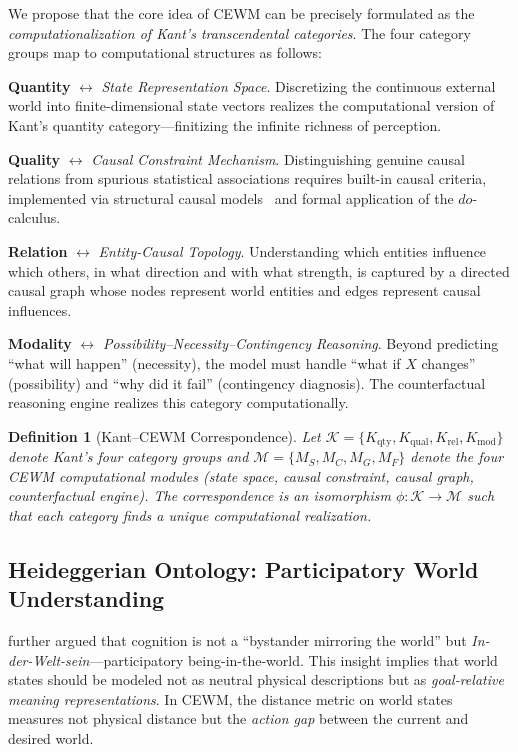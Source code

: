 \documentclass[11pt,a4paper]{article}
\newtheorem{definition}{Definition}[section]
\newcommand{\CEWM}{\textsc{CEWM}}
\begin{document}
We propose that the core idea of \CEWM{} can be precisely formulated as the \emph{computationalization of Kant's transcendental categories}. The four category groups map to computational structures as follows:

\textbf{Quantity} $\leftrightarrow$ \emph{State Representation Space}. Discretizing the continuous external world into finite-dimensional state vectors realizes the computational version of Kant's quantity category---finitizing the infinite richness of perception.

\textbf{Quality} $\leftrightarrow$ \emph{Causal Constraint Mechanism}. Distinguishing genuine causal relations from spurious statistical associations requires built-in causal criteria, implemented via structural causal models~\citep{pearl2009causality} and formal application of the $do$-calculus.

\textbf{Relation} $\leftrightarrow$ \emph{Entity-Causal Topology}. Understanding which entities influence which others, in what direction and with what strength, is captured by a directed causal graph whose nodes represent world entities and edges represent causal influences.

\textbf{Modality} $\leftrightarrow$ \emph{Possibility--Necessity--Contingency Reasoning}. Beyond predicting ``what will happen'' (necessity), the model must handle ``what if $X$ changes'' (possibility) and ``why did it fail'' (contingency diagnosis). The counterfactual reasoning engine realizes this category computationally.

\begin{definition}[Kant--\CEWM{} Correspondence]\label{def:kant}
Let $\mathcal{K} = \{K_{\mathrm{qty}}, K_{\mathrm{qual}}, K_{\mathrm{rel}}, K_{\mathrm{mod}}\}$ denote Kant's four category groups and $\mathcal{M} = \{M_S, M_C, M_G, M_F\}$ denote the four \CEWM{} computational modules (state space, causal constraint, causal graph, counterfactual engine). The correspondence is an isomorphism $\phi: \mathcal{K} \to \mathcal{M}$ such that each category finds a unique computational realization.
\end{definition}

\subsection{Heideggerian Ontology: Participatory World Understanding}

\citet{heidegger1927sein} further argued that cognition is not a ``bystander mirroring the world'' but \emph{In-der-Welt-sein}---participatory being-in-the-world. This insight implies that world states should be modeled not as neutral physical descriptions but as \emph{goal-relative meaning representations}. In \CEWM{}, the distance metric on world states measures not physical distance but the \emph{action gap} between the current and desired world.
\end{document}
